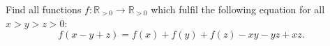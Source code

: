 Find all functions $f\colon\mathbb{R}_{>0}\rightarrow \mathbb{R}_{>0}$ which fulfil
the following equation for all $x>y>z>0$:
$$f(x-y+z)=f(x)+f(y)+f(z)-xy-yz+xz.$$
